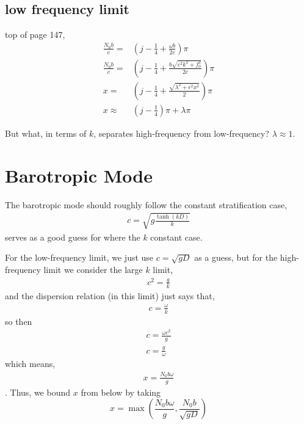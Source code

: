 \documentclass[11pt]{article}
\begin{document}
\subsection{low frequency limit}

top of page 147,
\begin{align}
\frac{N_0 b}{c} =& \left(j-\frac{1}{4}+\frac{\omega b}{2c}\right)\pi \\
\frac{N_0 b}{c} =& \left(j-\frac{1}{4}+\frac{b \sqrt{c^2 k^2 + f_0^2} }{2c}\right)\pi \\
x =& \left(j-\frac{1}{4}+\frac{\sqrt{\lambda^2 + \epsilon^2 x^2 } }{2}\right)\pi \\
x \approx& \left(j-\frac{1}{4} \right) \pi + \lambda \pi 
\end{align}

But what, in terms of $k$, separates high-frequency from low-frequency? $\lambda \approx 1$.

%
\section{Barotropic Mode}
%

The barotropic mode should roughly follow the constant stratification case,
\begin{align}
c = \sqrt{g \frac{\tanh(kD)}{k} }
\end{align}
serves as a good guess for where the $k$ constant case.

For the low-frequency limit, we just use $c = \sqrt{gD}$ as a guess, but for the high-frequency limit we consider the large $k$ limit,
\begin{align}
c^2 =  \frac{g}{k}
\end{align}
and the dispersion relation (in this limit) just says that,
\begin{align}
c =  \frac{\omega}{k}
\end{align}
so then
\begin{align}
c =  \frac{\omega c^2}{g} \\
c = \frac{g}{\omega}
\end{align}
which means,
\begin{align}
x = \frac{N_0 b \omega }{g}
\end{align}.
Thus, we bound $x$ from below by taking
\begin{equation}
x = \max \left(\frac{N_0 b \omega }{g}, \frac{N_0 b }{\sqrt{gD}} \right)
\end{equation}
\end{document}
